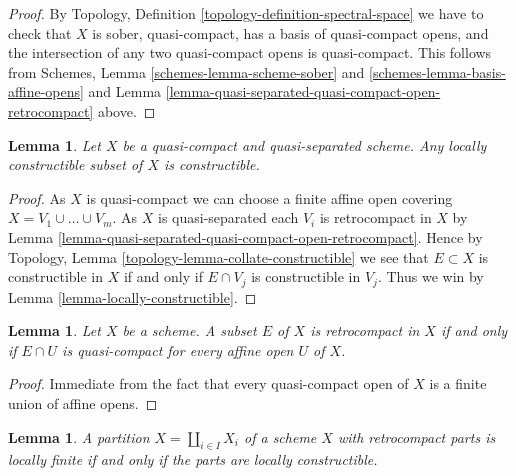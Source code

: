 \documentclass{stacks-project}
\theoremstyle{plain}
\newtheorem{lemma}[subsection]{Lemma}
\theoremstyle{definition}
\theoremstyle{remark}
\numberwithin{equation}{subsection}
\begin{document}
\begin{proof}
By Topology, Definition \ref{topology-definition-spectral-space}
we have to check that $X$ is sober, quasi-compact, has a basis
of quasi-compact opens, and the intersection of any two
quasi-compact opens is quasi-compact. This follows from
Schemes, Lemma \ref{schemes-lemma-scheme-sober} and
\ref{schemes-lemma-basis-affine-opens}
and
Lemma \ref{lemma-quasi-separated-quasi-compact-open-retrocompact}
above.
\end{proof}

\begin{lemma}
\label{lemma-constructible-quasi-compact-quasi-separated}
Let $X$ be a quasi-compact and quasi-separated scheme.
Any locally constructible subset of $X$ is constructible.
\end{lemma}

\begin{proof}
As $X$ is quasi-compact we can choose a finite affine open covering
$X = V_1 \cup \ldots \cup V_m$. As $X$ is quasi-separated each $V_i$ is
retrocompact in $X$ by
Lemma \ref{lemma-quasi-separated-quasi-compact-open-retrocompact}.
Hence by
Topology, Lemma \ref{topology-lemma-collate-constructible}
we see that $E \subset X$ is constructible in $X$ if and only if
$E \cap V_j$ is constructible in $V_j$. Thus we win by
Lemma \ref{lemma-locally-constructible}.
\end{proof}

\begin{lemma}
\label{lemma-retrocompact}
Let $X$ be a scheme. A subset $E$ of $X$ is retrocompact in $X$ if and only if
$E \cap U$ is quasi-compact for every affine open $U$ of $X$.
\end{lemma}

\begin{proof}
Immediate from the fact that every quasi-compact open of $X$ is a finite
union of affine opens.
\end{proof}

\begin{lemma}
\label{lemma-stratification-locally-finite-constructible}
A partition $X = \coprod_{i \in I} X_i$ of a scheme $X$ with
retrocompact parts is locally finite if and only if the parts
are locally constructible.
\end{lemma}
\end{document}
